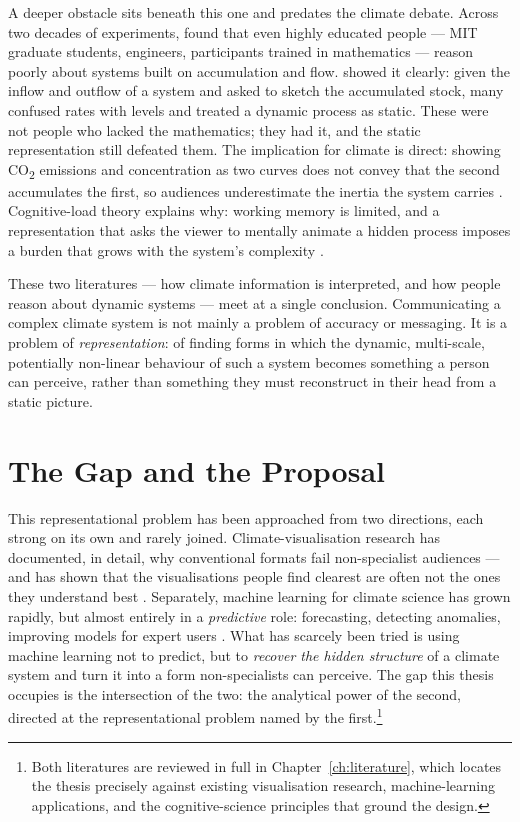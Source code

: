 A deeper obstacle sits beneath this one and predates the climate debate. Across two decades of experiments, \citet{sterman2008} found that even highly educated people --- MIT graduate students, engineers, participants trained in mathematics --- reason poorly about systems built on accumulation and flow. \citet{cronin2009} showed it clearly: given the inflow and outflow of a system and asked to sketch the accumulated stock, many confused rates with levels and treated a dynamic process as static. These were not people who lacked the mathematics; they had it, and the static representation still defeated them. The implication for climate is direct: showing CO\textsubscript{2} emissions and concentration as two curves does not convey that the second accumulates the first, so audiences underestimate the inertia the system carries \citep{cronin2009, sterman2008}. Cognitive-load theory explains why: working memory is limited, and a representation that asks the viewer to mentally animate a hidden process imposes a burden that grows with the system's complexity \citep{sweller1988}.
 
These two literatures --- how climate information is interpreted, and how people reason about dynamic systems --- meet at a single conclusion. Communicating a complex climate system is not mainly a problem of accuracy or messaging. It is a problem of \emph{representation}: of finding forms in which the dynamic, multi-scale, potentially non-linear behaviour of such a system becomes something a person can perceive, rather than something they must reconstruct in their head from a static picture.


\section{The Gap and the Proposal}
\label{sec:gap-proposal}
 
This representational problem has been approached from two directions, each strong on its own and rarely joined. Climate-visualisation research has documented, in detail, why conventional formats fail non-specialist audiences --- and has shown that the visualisations people find clearest are often not the ones they understand best \parencite{harold2016, hegarty2012}. Separately, machine learning for climate science has grown rapidly, but almost entirely in a \emph{predictive} role: forecasting, detecting anomalies, improving models for expert users \citep{reichstein2019, sonnewald2021}. What has scarcely been tried is using machine learning not to predict, but to \emph{recover the hidden structure} of a climate system and turn it into a form non-specialists can perceive. The gap this thesis occupies is the intersection of the two: the analytical power of the second, directed at the representational problem named by the first.\footnote{Both literatures are reviewed in full in Chapter~\ref{ch:literature}, which locates the thesis precisely against existing visualisation research, machine-learning applications, and the cognitive-science principles that ground the design.}
 
